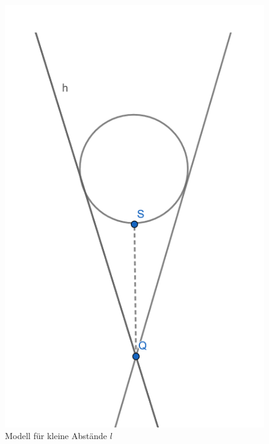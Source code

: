 \documentclass[german,  %
parskip=full,  %
]{scrartcl}
\begin{document}
\begin{figure}[h!]\centering
\includegraphics[scale=0.4]{abstand1}
\caption{Modell für kleine Abstände $l$}
\end{figure}
\end{document}
